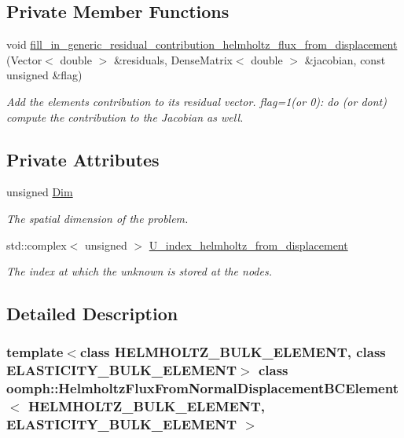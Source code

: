\subsection*{Private Member Functions}
\begin{DoxyCompactItemize}
\item 
void \hyperlink{classoomph_1_1HelmholtzFluxFromNormalDisplacementBCElement_a66f653fb85249296deb66cc91647cc52}{fill\+\_\+in\+\_\+generic\+\_\+residual\+\_\+contribution\+\_\+helmholtz\+\_\+flux\+\_\+from\+\_\+displacement} (Vector$<$ double $>$ \&residuals, Dense\+Matrix$<$ double $>$ \&jacobian, const unsigned \&flag)
\begin{DoxyCompactList}\small\item\em Add the element\textquotesingle{}s contribution to its residual vector. flag=1(or 0)\+: do (or don\textquotesingle{}t) compute the contribution to the Jacobian as well. \end{DoxyCompactList}\end{DoxyCompactItemize}
\subsection*{Private Attributes}
\begin{DoxyCompactItemize}
\item 
unsigned \hyperlink{classoomph_1_1HelmholtzFluxFromNormalDisplacementBCElement_a72d189d7598def4ce0ce2aecdc93bcd9}{Dim}
\begin{DoxyCompactList}\small\item\em The spatial dimension of the problem. \end{DoxyCompactList}\item 
std\+::complex$<$ unsigned $>$ \hyperlink{classoomph_1_1HelmholtzFluxFromNormalDisplacementBCElement_a84343ef8842d932061e696fdbd032590}{U\+\_\+index\+\_\+helmholtz\+\_\+from\+\_\+displacement}
\begin{DoxyCompactList}\small\item\em The index at which the unknown is stored at the nodes. \end{DoxyCompactList}\end{DoxyCompactItemize}


\subsection{Detailed Description}
\subsubsection*{template$<$class H\+E\+L\+M\+H\+O\+L\+T\+Z\+\_\+\+B\+U\+L\+K\+\_\+\+E\+L\+E\+M\+E\+NT, class E\+L\+A\+S\+T\+I\+C\+I\+T\+Y\+\_\+\+B\+U\+L\+K\+\_\+\+E\+L\+E\+M\+E\+NT$>$\newline
class oomph\+::\+Helmholtz\+Flux\+From\+Normal\+Displacement\+B\+C\+Element$<$ H\+E\+L\+M\+H\+O\+L\+T\+Z\+\_\+\+B\+U\+L\+K\+\_\+\+E\+L\+E\+M\+E\+N\+T, E\+L\+A\+S\+T\+I\+C\+I\+T\+Y\+\_\+\+B\+U\+L\+K\+\_\+\+E\+L\+E\+M\+E\+N\+T $>$}

